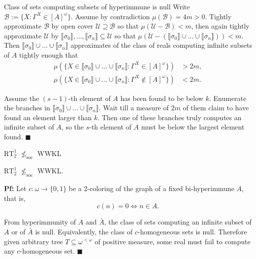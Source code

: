 \begin{frame}{Class of sets computing subsets of hyperimmune is null}
  Write $\mathcal{B} :=\{X: \Gamma^X\in[A]^\omega\}$.
  Assume by contradiction $\mu(\mathcal{B})=4m>0$. Tightly approximate
  $\mathcal{B}$ by open cover $\mathcal{U}\supseteq\mathcal{B}$ so that
  $\mu(\mathcal{U}-\mathcal{B})<m$, then again tightly approximate
  $\mathcal{U}$ by $\llbracket\sigma_0\rrbracket,
  \ldots,\llbracket\sigma_n\rrbracket \subseteq\mathcal{U}$ so
  that $\mu(\mathcal{U}-(\llbracket\sigma_0\rrbracket \cup\ldots
  \cup\llbracket\sigma_n\rrbracket)) <m$.
  Then $\llbracket\sigma_0\rrbracket \cup\ldots\cup
  \llbracket\sigma_n\rrbracket$ approximates of the class
  of reals computing infinite subsets of $A$ tightly enough that
  \begin{align*}
    \mu(\{X\in\llbracket\sigma_0\rrbracket \cup\ldots\cup
    \llbracket\sigma_n\rrbracket: \Gamma^X\in[A]^\omega\}) &>2m,\\
    \mu(\{X\in\llbracket\sigma_0\rrbracket \cup\ldots\cup
    \llbracket\sigma_n\rrbracket: \Gamma^X\not\in[A]^\omega\}) &<2m.
  \end{align*}

  Assume the $(s-1)$-th element of $A$ has been found to be below $k$.
  Enumerate the branches in $\llbracket\sigma_0\rrbracket \cup\ldots\cup
  \llbracket\sigma_n\rrbracket$.  Wait
  till a measure of $2m$ of them claim to have found an element larger than
  $k$. Then one of these branches truly computes an infinite subset of
  $A$, so the $s$-th element of $A$ must be below the largest element
  found. $\blacksquare$
\end{frame}

\begin{frame}{$\text{RT}_2^1$ $\nleq_{\text{soc}}$ WWKL}
  \begin{thm}
    $\text{RT}_2^1$ $\nleq_{\text{soc}}$ WWKL.
  \end{thm}

  \vspace{1em}
  \textbf{Pf:} Let $c:\omega\rightarrow\{0,1\}$ be a 2-coloring of the
  graph of a fixed bi-hyperimmune $A$, that is,
  \[c(n)=0 \Leftrightarrow n\in A.\]
  
  From hyperimmunity of $A$ and $\bar{A}$, the class of sets computing an
  infinite subset of $A$ or of $\bar{A}$ is null. Equivalently, the class
  of $c$-homogeneous sets is null. Therefore given arbitrary tree
  $T\subseteq\omega^{<\omega}$ of positive measure, some real must fail to
  compute any $c$-homogeneous set. $\blacksquare$
\end{frame}

